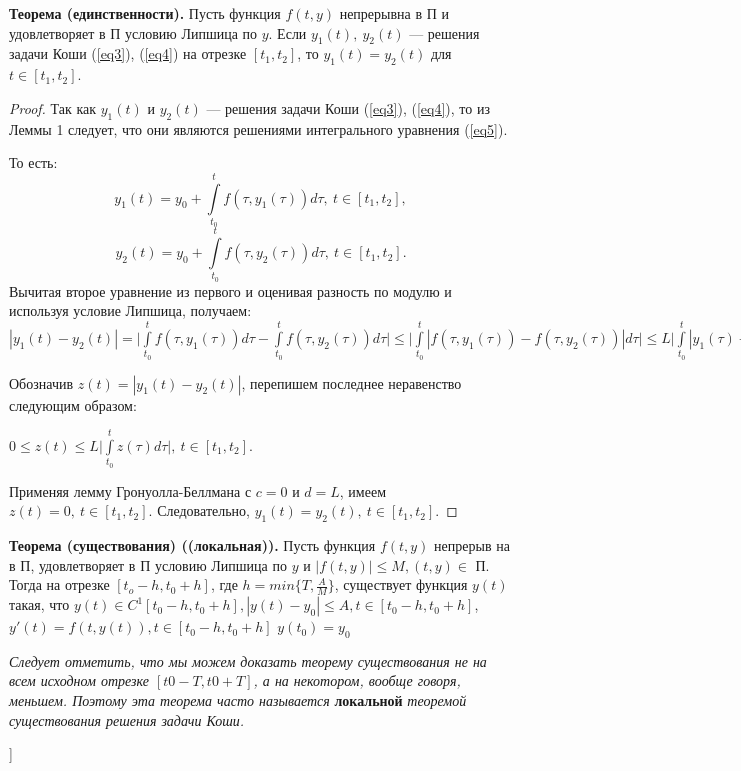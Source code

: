 \textbf{Теорема (единственности).} Пусть функция $f(t,y)$ непрерывна в П и удовлетворяет в П условию Липшица по $y$.
Если $y_1(t),~y_2(t)$ --- решения задачи Коши (\ref{eq3}), (\ref{eq4}) на отрезке $[t_1, t_2]$, то $y_1(t) = y_2(t)$ для $t \in [t_1, t_2]$.

\begin{proof} Так как $y_1(t)$ и $y_2(t)$ --- решения задачи Коши (\ref{eq3}), (\ref{eq4}), то из Леммы 1 следует, что они являются решениями интегрального уравнения (\ref{eq5}).

То есть:
$$y_1(t) = y_0 + \int\limits_{t_0}^{t}f(\tau, y_1(\tau))d\tau,~t\in[t_1,t_2],$$
$$y_2(t) = y_0 + \int\limits_{t_0}^{t}f(\tau, y_2(\tau))d\tau,~t\in[t_1,t_2].$$
Вычитая второе уравнение из первого и оценивая разность по модулю и используя условие Липшица, получаем:
$|y_1(t) - y_2(t)| = \Big| \int\limits_{t_0}^{t}f(\tau, y_1(\tau))d\tau - \int\limits_{t_0}^{t}f(\tau, y_2(\tau))d\tau \Big| \leq \Big| \int\limits_{t_0}^{t}|f(\tau, y_1(\tau)) - f(\tau, y_2(\tau))|d\tau \Big| \leq L\Big| \int\limits_{t_0}^{t}|y_1(\tau) - y_2(\tau)|d\tau \Big|$

Обозначив $z(t) = |y_1(t) - y_2(t)|$, перепишем последнее неравенство следующим образом:

$0 \leqslant z(t) \leqslant L\Big|\int\limits_{t_0}^{t}z(\tau)d\tau \Big|,~t \in [t_1,t_2].$

Применяя лемму Гронуолла-Беллмана с $c = 0$ и $d = L$, имеем
$z(t) = 0,~t \in [t_1, t_2]$. Следовательно, $y_1(t) = y_2(t),~t \in [t_1, t_2].$
\end{proof} 

\textbf{Теорема (существования) ((локальная)).}
Пусть функция $f(t,y)$ непрерыв на в П, удовлетворяет в П условию Липшица по $y$ и $|f(t,y)| \leq M, (t,y) \in$ П. Тогда на отрезке $[t_o - h, t_0 + h]$, где $h = min\{T, \frac{A}{M}\}$, существует функция $y(t)$ такая, что $y(t) \in C^1 [t_0-h, t_0 + h], |y(t) - y_0| \leq A, t \in [t_0 - h, t_0 + h]$,\newline
$y'(t) = f(t,y(t)), t \in [t_0 - h, t_0 + h]$
$y(t_0) = y_0$\newline

\textit{Следует отметить, что мы можем доказать теорему существования не на всем исходном отрезке $[t0 - T , t0 + T ]$, а на некотором, вообще говоря, меньшем. Поэтому эта теорема часто называется} \textbf{локальной} \textit{теоремой существования решения задачи Коши.}



\bigbreak
[\cite[page 25-30]{denisov}]